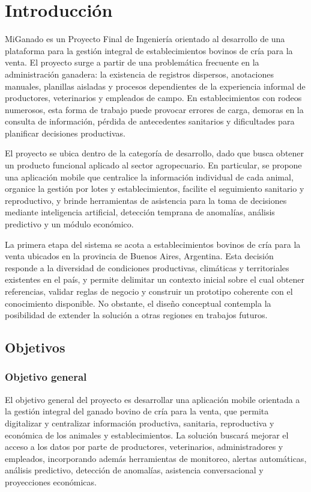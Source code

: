 \chapter{Introducci\'on}\label{chapter:introduccion}

MiGanado es un Proyecto Final de Ingenier\'ia orientado al desarrollo de una plataforma para la gesti\'on integral de establecimientos bovinos de cr\'ia para la venta. El proyecto surge a partir de una problem\'atica frecuente en la administraci\'on ganadera: la existencia de registros dispersos, anotaciones manuales, planillas aisladas y procesos dependientes de la experiencia informal de productores, veterinarios y empleados de campo. En establecimientos con rodeos numerosos, esta forma de trabajo puede provocar errores de carga, demoras en la consulta de informaci\'on, p\'erdida de antecedentes sanitarios y dificultades para planificar decisiones productivas.

El proyecto se ubica dentro de la categor\'ia de desarrollo, dado que busca obtener un producto funcional aplicado al sector agropecuario. En particular, se propone una aplicaci\'on mobile que centralice la informaci\'on individual de cada animal, organice la gesti\'on por lotes y establecimientos, facilite el seguimiento sanitario y reproductivo, y brinde herramientas de asistencia para la toma de decisiones mediante inteligencia artificial, detecci\'on temprana de anomal\'ias, an\'alisis predictivo y un m\'odulo econ\'omico.

La primera etapa del sistema se acota a establecimientos bovinos de cr\'ia para la venta ubicados en la provincia de Buenos Aires, Argentina. Esta decisi\'on responde a la diversidad de condiciones productivas, clim\'aticas y territoriales existentes en el pa\'is, y permite delimitar un contexto inicial sobre el cual obtener referencias, validar reglas de negocio y construir un prototipo coherente con el conocimiento disponible. No obstante, el dise\~no conceptual contempla la posibilidad de extender la soluci\'on a otras regiones en trabajos futuros.

\section{Objetivos}

\subsection{Objetivo general}

El objetivo general del proyecto es desarrollar una aplicaci\'on mobile orientada a la gesti\'on integral del ganado bovino de cr\'ia para la venta, que permita digitalizar y centralizar informaci\'on productiva, sanitaria, reproductiva y econ\'omica de los animales y establecimientos. La soluci\'on buscar\'a mejorar el acceso a los datos por parte de productores, veterinarios, administradores y empleados, incorporando adem\'as herramientas de monitoreo, alertas autom\'aticas, an\'alisis predictivo, detecci\'on de anomal\'ias, asistencia conversacional y proyecciones econ\'omicas.


